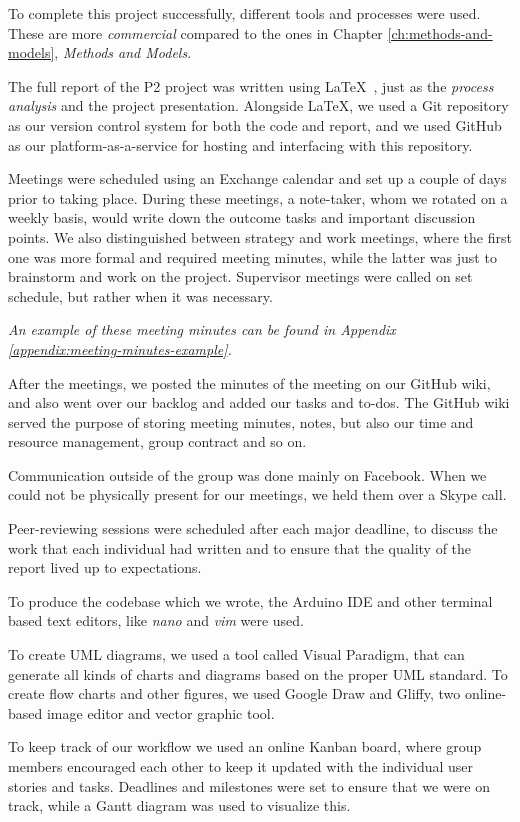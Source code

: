 To complete this project successfully, different tools and processes were used. These are more \textit{commercial} compared to the ones in Chapter \ref{ch:methods-and-models}, \textit{Methods and Models}.

The full report of the P2 project was written using \LaTeX ~, just as the \textit{process analysis} and the project presentation. Alongside \LaTeX , we used a Git repository as our version control system for both the code and report, and we used GitHub as our platform-as-a-service for hosting and interfacing with this repository.

Meetings were scheduled using an Exchange calendar and set up a couple of days prior to taking place. During these meetings, a note-taker, whom we rotated on a weekly basis, would write down the outcome tasks and important discussion points. We also distinguished between strategy and work meetings, where the first one was more formal and required meeting minutes, while the latter was just to brainstorm and work on the project. Supervisor meetings were called on set schedule, but rather when it was necessary.

\textit{An example of these meeting minutes can be found in Appendix \ref{appendix:meeting-minutes-example}.}

After the meetings, we posted the minutes of the meeting on our GitHub wiki, and also went over our backlog and added our tasks and to-dos. The GitHub wiki served the purpose of storing meeting minutes, notes, but also our time and resource management, group contract and so on. 

Communication outside of the group was done mainly on Facebook. When we could not be physically present for our meetings, we held them over a Skype call.

Peer-reviewing sessions were scheduled after each major deadline, to discuss the work that each individual had written and to ensure that the quality of the report lived up to expectations.

To produce the codebase which we wrote, the Arduino IDE and other terminal based text editors, like \textit{nano} and \textit{vim} were used.

To create UML diagrams, we used a tool called Visual Paradigm, that can generate all kinds of charts and diagrams based on the proper UML standard. To create flow charts and other figures, we used Google Draw and Gliffy, two online-based image editor and vector graphic tool.

To keep track of our workflow we used an online Kanban board, where group members encouraged each other to keep it updated with the individual user stories and tasks. Deadlines and milestones were set to ensure that we were on track, while a Gantt diagram was used to visualize this.

